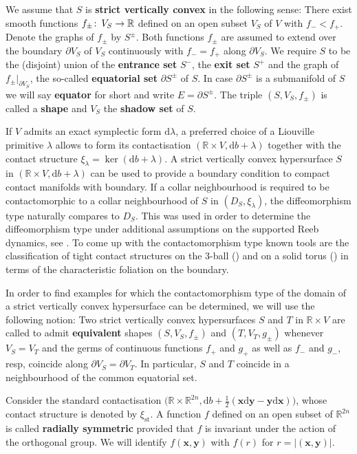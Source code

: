 \documentclass{amsart}
\theoremstyle{definition}
\def\co{\colon\thinspace}
\newcommand{\rmd}{\mathrm d}
\newcommand{\R}{\mathbb R}
\newcommand{\bfx}{\mathbf x}
\newcommand{\bfy}{\mathbf y}
\newcommand{\ra}{\rightarrow}
\DeclareMathOperator{\st}{\mathrm{st}}
\begin{document}
We assume that $S$ is {\bf strict vertically convex} in the following sense:
There exist smooth functions $f_{\pm}\co V_S\ra\R$
defined on an open subset $V_S$ of $V$
with $f_-<f_+$.
Denote the graphs of $f_{\pm}$ by $S^{\pm}$.
Both functions $f_{\pm}$ are assumed to extend
over the boundary $\partial V_S$ of $V_S$ continuously
with $f_-=f_+$ along $\partial V_S$.
We require $S$ to be the (disjoint) union of
the {\bf entrance set} $S^-$, the {\bf exit set} $S^+$
and the graph of $f_{\pm}|_{\partial V_S}$,
the so-called {\bf equatorial set} $\partial S^{\pm}$ of $S$.
In case $\partial S^{\pm}$ is a submanifold of $S$
we will say {\bf equator} for short and write $E=\partial S^{\pm}$.
The triple $(S,V_S,f_{\pm})$ is called a {\bf shape}
and $V_S$ the {\bf shadow set} of $S$.

If $V$ admits an exact symplectic form $\rmd\lambda$,
a preferred choice of a Liouville primitive $\lambda$
allows to form its contactisation $(\R\times V,\rmd b+\lambda)$
together with the contact structure 
$\xi_{\lambda}=\ker(\rmd b+\lambda)$.
A strict vertically convex hypersurface $S$
in $(\R\times V,\rmd b+\lambda)$
can be used to provide a boundary condition
to compact contact manifolds with boundary.
If a collar neighbourhood is required to be
contactomorphic to a collar neighbourhood of $S$
in $(D_S,\xi_{\lambda})$,
the diffeomorphism type naturally compares to $D_S$.
This was used
in order to determine the diffeomorphism type
under additional assumptions on the supported Reeb dynamics,
see \cite{bschz19,beck23,eh94,grz14,gz16b,kschz20,kwz22}.
To come up with the contactomorphism type
known tools are the classification of tight contact structures
on the $3$-ball (\cite{elia92}) and on a solid torus (\cite{mak98})
in terms of the characteristic foliation on the boundary.

In order to find examples
for which the contactomorphism type
of the domain of a strict vertically convex hypersurface
can be determined, we will use the following notion:
Two strict vertically convex hypersurfaces
$S$ and $T$ in $\R\times V$
are called to admit {\bf equivalent}
shapes $(S,V_S,f_{\pm})$ and $(T,V_T,g_{\pm})$
whenever $V_S=V_T$ and the germs of
continuous functions $f_+$ and $g_+$
as well as $f_-$ and $g_-$, resp,
coincide along $\partial V_S=\partial V_T$.
In particular, $S$ and $T$ coincide in a neighbourhood
of the common equatorial set.

Consider the standard contactisation
$\big(\R\times\R^{2n},\rmd b+\tfrac12(\bfx\rmd\bfy-\bfy\rmd\bfx)\big)$,
whose contact structure is denoted by $\xi_{\st}$.
A function $f$ defined on an open subset of $\R^{2n}$
is called {\bf radially symmetric} provided that $f$
is invariant under the action of the orthogonal group.
We will identify $f(\bfx,\bfy)$ with $f(r)$ for $r=|(\bfx,\bfy)|$.
\end{document}
